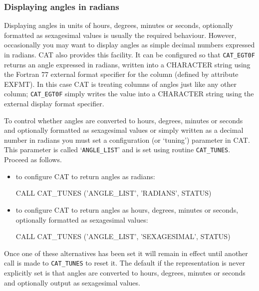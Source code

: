 \documentclass[11pt,twoside]{starlink}
\begin{document}
\subsubsection{Displaying angles in radians}

Displaying angles in units of hours, degrees, minutes or seconds,
optionally formatted as sexagesimal values is usually the required
behaviour. However, occasionally you may want to display angles as
simple decimal numbers expressed in radians. CAT also provides this
facility. It can be configured so that \texttt{CAT\_EGT0F} returns an
angle expressed in radians, written into a CHARACTER string using
the Fortran 77 external format specifier for the column (defined by
attribute EXFMT). In this case CAT is treating columns of angles
just like any other column; \texttt{CAT\_EGT0F} simply writes the
value into a CHARACTER string using the external display format
specifier.

To control whether angles are converted to hours, degrees, minutes or
seconds and optionally formatted as sexagesimal values or simply written
as a decimal number in radians you must set a configuration (or
`tuning') parameter in CAT. This parameter is called `\texttt{ANGLE\_LIST}'
and is set using routine \texttt{CAT\_TUNES}. Proceed as follows.

\begin{itemize}

  \item to configure CAT to return angles as radians:

  \begin{terminalv}
CALL CAT\_TUNES ('ANGLE_LIST', 'RADIANS', STATUS)
  \end{terminalv}

  \item to configure CAT to return angles as hours, degrees, minutes
   or seconds, optionally formatted as sexagesimal values:

  \begin{terminalv}
CALL CAT_TUNES ('ANGLE_LIST', 'SEXAGESIMAL', STATUS)
  \end{terminalv}

\end{itemize}

Once one of these alternatives has been set it will remain in
effect until another call is made to \texttt{CAT\_TUNES} to reset
it. The default if the representation is never explicitly set is
that angles are converted to hours, degrees, minutes or seconds and
optionally output as sexagesimal values.
\end{document}
